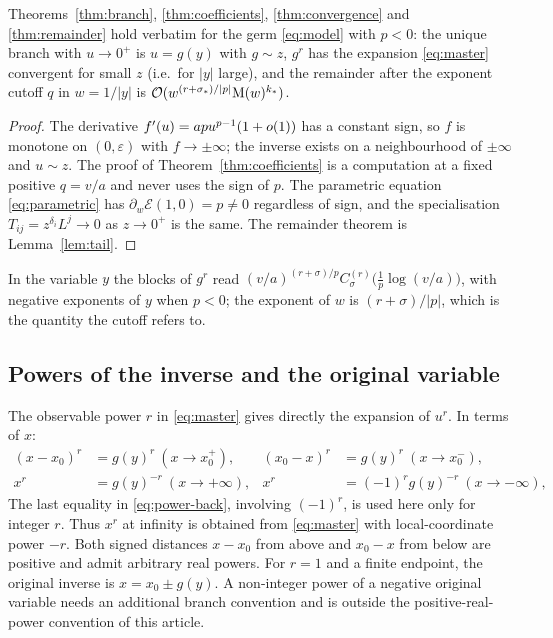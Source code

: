 \begin{theorem}
\label{thm:endpoints}
Theorems~\ref{thm:branch}, \ref{thm:coefficients}, \ref{thm:convergence} and \ref{thm:remainder} hold verbatim for the germ \eqref{eq:model} with $p<0$: the unique branch with $u\to0^+$ is $u=g(y)$ with $g\sim z$, $g^r$ has the expansion \eqref{eq:master} convergent for small $z$ (i.e.\ for $|y|$ large), and the remainder after the exponent cutoff $q$ in $w=1/|y|$ is $\mathcal O(w^{(r+\sigma_*)/|p|}\mathrm M(w)^{k_*})$.
\end{theorem}
\begin{proof}
The derivative $f'(u)=apu^{p-1}(1+o(1))$ has a constant sign, so $f$ is monotone on $(0,\varepsilon)$ with $f\to\pm\infty$; the inverse exists on a neighbourhood of $\pm\infty$ and $u\sim z$. The proof of Theorem~\ref{thm:coefficients} is a computation at a fixed positive $q=v/a$ and never uses the sign of $p$. The parametric equation \eqref{eq:parametric} has $\partial_w\mathcal E(1,0)=p\ne0$ regardless of sign, and the specialisation $T_{ij}=z^{\delta_i}L^j\to0$ as $z\to0^+$ is the same. The remainder theorem is Lemma~\ref{lem:tail}.
\end{proof}

In the variable $y$ the blocks of $g^r$ read $(v/a)^{(r+\sigma)/p}C^{(r)}_\sigma\bigl(\tfrac1p\log(v/a)\bigr)$, with negative exponents of $y$ when $p<0$; the exponent of $w$ is $(r+\sigma)/|p|$, which is the quantity the cutoff refers to.

\subsection{Powers of the inverse and the original variable}

The observable power $r$ in \eqref{eq:master} gives directly the expansion of $u^r$. In terms of $x$:
\begin{equation}
\begin{aligned}
 (x-x_0)^r&=g(y)^r\ (x\to x_0^+),& (x_0-x)^r&=g(y)^r\ (x\to x_0^-),\\
 x^r&=g(y)^{-r}\ (x\to+\infty),& x^r&=(-1)^rg(y)^{-r}\ (x\to-\infty),
\end{aligned}
 \label{eq:power-back}
\end{equation}
The last equality in \eqref{eq:power-back}, involving $(-1)^r$, is used here only for integer $r$. Thus $x^r$ at infinity is obtained from \eqref{eq:master} with local-coordinate power $-r$. Both signed distances $x-x_0$ from above and $x_0-x$ from below are positive and admit arbitrary real powers. For $r=1$ and a finite endpoint, the original inverse is $x=x_0\pm g(y)$. A non-integer power of a negative original variable needs an additional branch convention and is outside the positive-real-power convention of this article.

